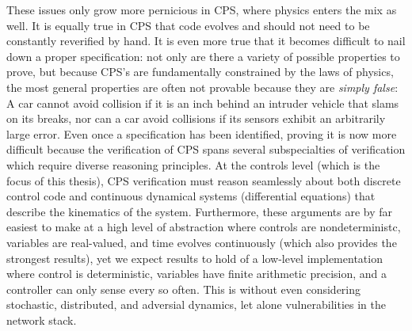 \documentclass[12pt]{cmuthesis}
\theoremstyle{definition}
\theoremstyle{remark}
\begin{document}
These issues only grow more pernicious in CPS, where physics enters the mix as well.
It is equally true in CPS that code evolves and should not need to be constantly reverified by hand.
It is even more true that it becomes difficult to nail down a proper specification: not only are there a variety of possible properties to prove, but because CPS's are fundamentally constrained by the laws of physics, the most general properties are often not provable because they are \emph{simply false}: A car cannot avoid collision if it is an inch behind an intruder vehicle that slams on its breaks, nor can a car avoid collisions if its sensors exhibit an arbitrarily large error.
Even once a specification has been identified, proving it is now more difficult because the verification of CPS spans several subspecialties of verification which require diverse reasoning principles.
At the controls level (which is the focus of this thesis), CPS verification must reason seamlessly about both discrete control code and continuous dynamical systems (differential equations) that describe the kinematics of the system. Furthermore, these arguments are by far easiest to make at a high level of abstraction where controls are nondeterministc, variables are real-valued, and time evolves continuously (which also provides the strongest results), yet we expect results to hold of a low-level implementation where control is deterministic, variables have finite arithmetic precision, and a controller can only sense every so often.
This is without even considering stochastic, distributed, and adversial dynamics, let alone vulnerabilities in the network stack.
\end{document}
